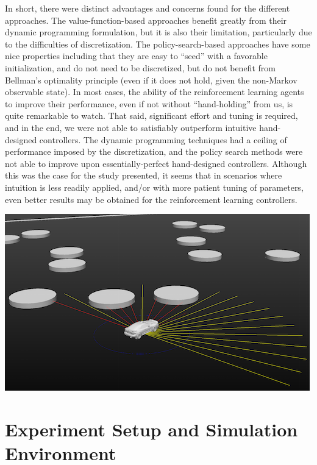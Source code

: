 \documentclass{article}
\begin{document}
In short, there were distinct advantages and concerns found for the different approaches.    The value-function-based approaches benefit greatly from their dynamic programming formulation, but it is also their limitation, particularly due to the difficulties of discretization.  The policy-search-based approaches have some nice properties including that they are easy to ``seed'' with a favorable initialization, and do not need to be discretized, but do not benefit from Bellman's optimality principle (even if it does not hold, given the non-Markov observable state).  In most cases, the ability of the reinforcement learning agents to improve their performance, even if not without ``hand-holding'' from us, is quite remarkable to watch.  That said, significant effort and tuning is required, and in the end, we were not able to satisfiably outperform intuitive hand-designed controllers.  The dynamic programming techniques had a ceiling of performance imposed by the discretization, and the policy search methods were not able to improve upon essentially-perfect hand-designed controllers.  Although this was the case for the study presented, it seems that in scenarios where intuition is less readily applied, and/or with more patient tuning of parameters, even better results may be obtained for the reinforcement learning controllers.

\begin{center}
  \includegraphics[scale=0.5]{figures/firstFig.png}
  \label{fig:test}
\end{center}

\section{Experiment Setup and Simulation Environment}
\end{document}
